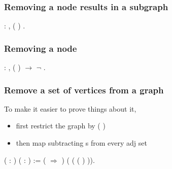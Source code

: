 \subsubsection{Removing a node results in a subgraph}


\begin{coqdoccode}
\coqdocemptyline
\coqdocnoindent
{}  : \coqdockw{\ensuremath{\forall}}  ,  (  ) .\coqdoceol
\coqdocemptyline
\end{coqdoccode}
\subsubsection{Removing a node}


\begin{coqdoccode}
\coqdocnoindent
{}  : \coqdockw{\ensuremath{\forall}}   ,\coqdoceol
\coqdocindent{2.00em}
  (  ) \ensuremath{\rightarrow} \ensuremath{\lnot}   .\coqdoceol
\coqdocemptyline
\end{coqdoccode}
\subsubsection{Remove a set of vertices from a graph}

 To make it easier to prove things about it,

\begin{itemize}
\item  first restrict the graph by  ( ) 

\item  then map subtracting s from every adj set


\end{itemize}
\begin{coqdoccode}
\coqdocnoindent
{}  ( : ) ( : ) :=\coqdoceol
\coqdocindent{1.00em}
 (  \ensuremath{\Rightarrow}   ) (  ( ( ) )).\coqdoceol
\coqdocemptyline
\end{coqdoccode}
